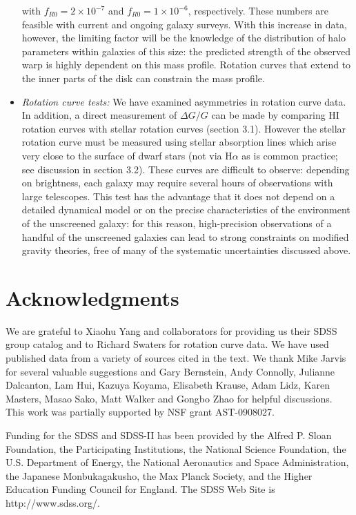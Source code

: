 \documentclass[twocolappendix, numberedappendix]{emulateapj}
\newcommand{\ha}{H$\alpha$}
\begin{document}
\begin{itemize}
  with $f_{R0} = 2\times10^{-7}$ and $f_{R0} = 1\times10^{-6}$, respectively.
  These numbers are feasible with  current and ongoing galaxy surveys.
  With this increase in data, however, the limiting factor will be the
  knowledge of the distribution of halo parameters within galaxies of this
  size: the predicted strength of the observed warp is highly dependent on
  this mass profile. Rotation curves that extend to the inner parts of the disk
can
  constrain the mass profile. 
\item {\it  Rotation curve tests: }
  We have examined asymmetries in rotation curve data. In addition, 
  a direct measurement of $\Delta G/G$ can be made by
  comparing HI rotation curves with stellar rotation curves (section 3.1). However 
  the stellar rotation curve must be measured using stellar absorption
  lines which arise very close to the surface of dwarf stars (not via 
  \ha{} as is common practice; see discussion in section 3.2).  These curves
  are difficult to observe: depending on brightness, each galaxy may require
  several hours of observations with large telescopes. This test
  has the advantage that it does not depend on a detailed dynamical model
  or on the precise characteristics of the environment of the unscreened
  galaxy: for this reason, high-precision observations of
  a handful of the unscreened galaxies can lead to strong constraints on
  modified gravity theories, free of many of the systematic uncertainties
  discussed above.
\end{itemize}


\section{Acknowledgments}
We are grateful to Xiaohu Yang and collaborators 
for providing us their SDSS group catalog and to Richard Swaters for 
rotation curve data. We have used published data from a variety of sources
cited in the text.  
We thank Mike Jarvis for several valuable suggestions and Gary 
Bernstein, Andy Connolly, Julianne Dalcanton, Lam Hui, Kazuya Koyama, 
Elisabeth Krause, Adam Lidz, Karen Masters, Masao Sako, 
Matt Walker and Gongbo Zhao for helpful
discussions. This work was partially supported by NSF grant AST-0908027.

Funding for the SDSS and SDSS-II has been provided by the Alfred P. Sloan
Foundation, the Participating Institutions, the National Science Foundation,
the U.S. Department of Energy, the National Aeronautics and Space
Administration, the Japanese Monbukagakusho, the Max Planck Society, and the
Higher Education Funding Council for England. The SDSS Web Site is
http://www.sdss.org/.
\end{document}
